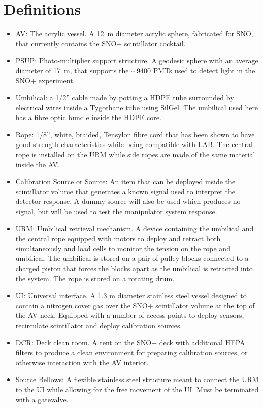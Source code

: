 \documentclass[11pt]{article}
\begin{document}
\section{Definitions}
\begin{itemize}
\item AV: The acrylic vessel. A 12~m diameter acrylic sphere, fabricated for SNO, that currently contains the SNO+ scintillator cocktail.
\item PSUP: Photo-multiplier support structure. A geodesic sphere with an average diameter of 17~m, that supports the $\sim$9400 PMTs used to detect light in the SNO+ experiment.
\item Umbilical: a 1/2'' cable made by potting a HDPE tube surrounded by electrical wires inside a Tygothane tube using SilGel. The umbilical used here has a fibre optic bundle inside the HDPE core.  
\item Rope: 1/8'', white, braided, Tensylon fibre cord that has been shown to have good strength characteristics while being compatible with LAB. The central rope is installed on the URM while side ropes are made of the same material inside the AV. 
\item Calibration Source or Source: An item that can be deployed inside the scintillator volume that generates a known signal used to interpret the detector response. A dummy source will also be used which produces no signal, but will be used to test the manipulator system response.
\item URM: Umbilical retrieval mechanism. A device containing the umbilical and the central rope equipped with motors to deploy and retract both simultaneously and load cells to monitor the tension on the rope and umbilical. The umbilical is stored on a pair of pulley blocks connected to a charged piston that forces the blocks apart as the umbilical is retracted into the system. The rope is stored on a rotating drum.
\item UI: Universal interface. A 1.3 m diameter stainless steel vessel designed to contain a nitrogen cover gas over the SNO+ scintillator volume at the top of the AV neck. Equipped with a number of access points to deploy sensors, recirculate scintillator and deploy calibration sources.
\item DCR: Deck clean room. A tent on the SNO+ deck with additional HEPA filters to produce a clean environment for preparing calibration sources, or otherwise interaction with the AV interior. 
\item Source Bellows: A flexible stainless steel structure meant to connect the URM to the UI while allowing for the free movement of the UI. Must be terminated with a gatevalve. 

\end{itemize}
\end{document}
